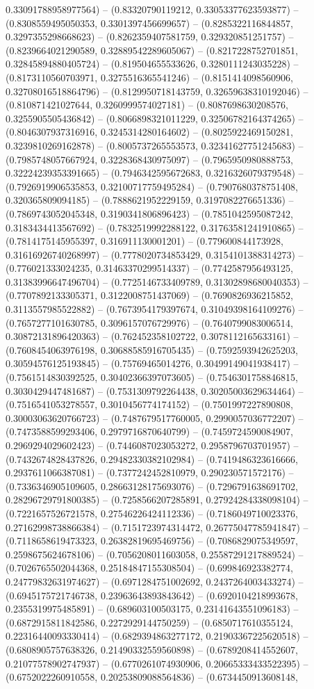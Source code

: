 0.33091788958977564) -- (0.83320790119212, 0.33053377623593877) -- (0.8308559495050353, 0.3301397456699657) -- (0.8285322116844857, 0.3297355298668623) -- (0.8262359407581759, 0.329320851251757) -- (0.8239664021290589, 0.32889542289605067) -- (0.8217228752701851, 0.32845894880405724) -- (0.819504655533626, 0.3280111243035228) -- (0.8173110560703971, 0.3275516365541246) -- (0.8151414098560906, 0.32708016518864796) -- (0.8129950718143759, 0.32659638310192046) -- (0.810871421027644, 0.3260999574027181) -- (0.8087698630208576, 0.3255905505436842) -- (0.8066898321011229, 0.32506782164374265) -- (0.8046307937316916, 0.3245314280164602) -- (0.8025922469150281, 0.3239810269162878) -- (0.8005737265553573, 0.32341627751245683) -- (0.7985748057667924, 0.3228368430975097) -- (0.7965950980888753, 0.32224239353391665) -- (0.7946342595672683, 0.3216326079379548) -- (0.7926919906535853, 0.32100717759495284) -- (0.7907680378751408, 0.320365809094185) -- (0.7888621952229159, 0.3197082276651336) -- (0.7869743052045348, 0.3190341806896423) -- (0.7851042595087242, 0.3183434413567692) -- (0.7832519992288122, 0.31763581241910865) -- (0.7814175145955397, 0.316911130001201) -- (0.779600844173928, 0.31616926740268997) -- (0.7778020734853429, 0.3154101388314273) -- (0.776021333024235, 0.31463370299514337) -- (0.7742587956493125, 0.31383996647496704) -- (0.7725146733409789, 0.31302898680040353) -- (0.7707892133305371, 0.3122008751437069) -- (0.7690826936215852, 0.3113557985522882) -- (0.7673954179397674, 0.31049398164109276) -- (0.7657277101630785, 0.3096157076729976) -- (0.7640799083006514, 0.30872131896420363) -- (0.762452358102722, 0.3078112165633161) -- (0.7608454063976198, 0.30688585916705435) -- (0.7592593942625203, 0.30594576125193845) -- (0.75769465014276, 0.30499149041938417) -- (0.7561514830392525, 0.30402366397073605) -- (0.7546301758846815, 0.3030429447481687) -- (0.7531309792264438, 0.30205003629634464) -- (0.7516541053278557, 0.3010456774174152) -- (0.7501997227890808, 0.30003063620766723) -- (0.7487679517760005, 0.2990057036772207) -- (0.7473588599293406, 0.2979716870640799) -- (0.7459724590084907, 0.2969294029602423) -- (0.7446087023053272, 0.2958796703701957) -- (0.7432674828437826, 0.29482330382102984) -- (0.7419486323616666, 0.2937611066387081) -- (0.7377242452810979, 0.290230571572176) -- (0.7336346905109605, 0.28663128175693076) -- (0.7296791638691702, 0.28296729791800385) -- (0.7258566207285891, 0.27924284338098104) -- (0.7221657526721578, 0.27546226424112336) -- (0.7186049710023376, 0.27162998738866384) -- (0.7151723974314472, 0.26775047785941847) -- (0.7118658619473323, 0.26382819695469756) -- (0.7086829075349597, 0.2598675624678106) -- (0.7056208011603058, 0.25587291217889524) -- (0.7026765502044368, 0.25184847155308504) -- (0.699846923382774, 0.24779832631974627) -- (0.6971284751002692, 0.2437264003433274) -- (0.6945175721746738, 0.23963643893843642) -- (0.6920104218993678, 0.2355319975485891) -- (0.689603100503175, 0.23141643551096183) -- (0.6872915811842586, 0.2272929144750259) -- (0.6850717610355124, 0.22316440093330414) -- (0.6829394863277172, 0.21903367225620518) -- (0.6808905757638326, 0.21490332559560898) -- (0.6789208414552607, 0.21077578902747937) -- (0.6770261074930906, 0.20665333433522395) -- (0.6752022260910558, 0.20253809088564836) -- (0.6734450913608148, 